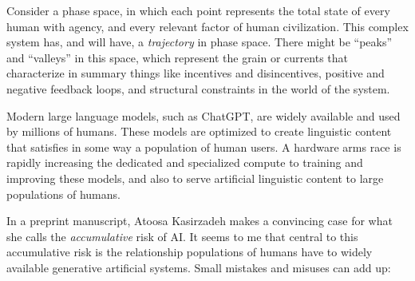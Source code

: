 \documentclass[11pt, oneside]{article}   	%
\begin{document}















Consider a phase space, in which each point represents the total state of every human with agency, and every relevant factor of human civilization.  This complex system has, and will have, a \emph{trajectory} in phase space.  There might be ``peaks'' and ``valleys'' in this space, which represent the grain or currents that characterize in summary things like incentives and disincentives, positive and negative feedback loops, and structural constraints in the world of the system.

Modern large language models, such as ChatGPT, are widely available and used by millions of humans.  These models are optimized to create linguistic content that satisfies in some way a population of human users.  A hardware arms race is rapidly increasing the dedicated and specialized compute to training and improving these models, and also to serve artificial linguistic content to large populations of humans.


In a preprint manuscript, Atoosa Kasirzadeh makes a convincing case for what she calls the \emph{accumulative} risk of AI. \citep{Kasirzadeh2024WIP}  It seems to me that central to this accumulative risk is the relationship populations of humans have to widely available generative artificial systems.  Small mistakes and misuses can add up: 
\end{document}
